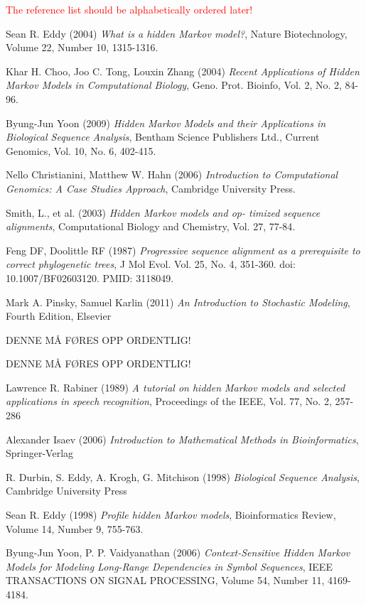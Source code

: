\documentclass{article}
\begin{document}
\textcolor{red}{The reference list should be alphabetically ordered later!}
\begin{thebibliography}{20}
Sean R. Eddy (2004) \emph{What is a hidden Markov model?}, Nature Biotechnology, Volume 22, Number 10, 1315-1316.

Khar H. Choo, Joo C. Tong, Louxin Zhang (2004) \emph{Recent Applications of Hidden Markov Models in Computational Biology}, Geno. Prot. Bioinfo, Vol. 2, No. 2, 84-96.

Byung-Jun Yoon (2009) \emph{Hidden Markov Models and their Applications in Biological Sequence Analysis}, Bentham Science Publishers Ltd., Current Genomics, Vol. 10, No. 6, 402-415.

Nello Christianini, Matthew W. Hahn (2006) \emph{Introduction to Computational Genomics: A Case Studies Approach}, Cambridge University Press.

Smith, L., et al. (2003) \emph{Hidden Markov models and op-
timized sequence alignments}, Computational Biology and Chemistry, Vol. 27, 77-84.

Feng DF, Doolittle RF (1987) \emph{Progressive sequence alignment as a prerequisite to correct phylogenetic trees}, J Mol Evol. Vol. 25, No. 4, 351-360. doi: 10.1007/BF02603120. PMID: 3118049.

Mark A. Pinsky, Samuel Karlin (2011) \emph{An Introduction to Stochastic Modeling}, Fourth Edition, Elsevier

DENNE MÅ FØRES OPP ORDENTLIG!

DENNE MÅ FØRES OPP ORDENTLIG!

Lawrence R. Rabiner (1989) \emph{A tutorial on hidden Markov models and selected applications in speech recognition}, Proceedings of the IEEE, Vol. 77, No. 2, 257-286

Alexander Isaev (2006) \emph{Introduction to Mathematical Methods in Bioinformatics}, Springer-Verlag

R. Durbin, S. Eddy, A. Krogh, G. Mitchison (1998) \emph{Biological Sequence Analysis}, Cambridge University Press

Sean R. Eddy (1998) \emph{Profile hidden Markov models}, Bioinformatics Review, Volume 14, Number 9, 755-763.

Byung-Jun Yoon, P. P. Vaidyanathan (2006) \emph{Context-Sensitive Hidden Markov Models for Modeling Long-Range Dependencies in Symbol Sequences}, IEEE TRANSACTIONS ON SIGNAL PROCESSING, Volume 54, Number 11, 4169-4184.

\end{thebibliography}
\end{document}
